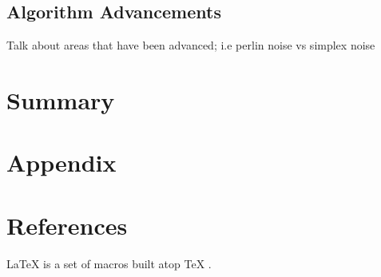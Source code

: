 \documentclass[12pt]{article}
\begin{document}
		\subsection{Algorithm Advancements}
		Talk about areas that have been advanced; i.e perlin noise vs simplex noise 
	
	\section{Summary}
	\section{Appendix}
	\section{References}
	
	\LaTeX{} \cite{7522149} is a set of macros built atop \TeX{} \cite{7522149}.
		

	
\end{document}
